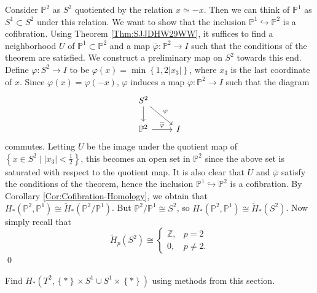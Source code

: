 \begin{solution}
    Consider $\mathbb{P}^2$ as 
    $S^2$ quotiented by the relation
    $x \simeq -x$. Then
    we can think of  $\mathbb{P}^{1}$ as
    $S^{1} \subset S^{2}$ under this relation.
    We want to show that the inclusion
    $\mathbb{P}^{1} \hookrightarrow \mathbb{P}^2$ is a
    cofibration. 
    Using Theorem \ref{Thm:SJJDHW29WW}, it suffices to
    find a neighborhood $U$ of $\mathbb{P}^{1} \subset 
    \mathbb{P}^2$ and a map $\overline{\varphi } \colon
    \mathbb{P}^2 \to I$ such that
    the conditions of the theorem are satisfied.
    We construct a preliminary map on
    $S^2$ towards this end. 
    Define $\varphi \colon S^2 \to I$ to be
    $\varphi (x) = 
    \min \left\{ 1, 2 \left| x_3 \right|  \right\} $, where
    $x_3$ is the last coordinate of $x$. Since
    $\varphi (x) = \varphi (-x)$, $\varphi $ induces
    a map $\overline{\varphi }\colon
    \mathbb{P}^2 \to I$ such that the diagram
    \begin{equation*}
    \begin{tikzcd}
        S^2 \ar[d] \ar[dr, "\varphi "] & \\
        \mathbb{P}^2 \ar[r, "\overline{\varphi }"] & I
    \end{tikzcd}
    \end{equation*}
    commutes.
    Letting $U$ be the image under the quotient
    map of 
    $\left\{ x \in S^2  \mid 
    \left| x_3 \right| < \frac{1}{2} \right\} $, this
    becomes an open set in $\mathbb{P}^2$ since 
    the above set is saturated with respect to the quotient
    map. It is also clear that
    $U$ and $\overline{\varphi }$ satisfy the conditions of
    the theorem, hence the inclusion
    $\mathbb{P}^{1} \hookrightarrow \mathbb{P}^2$ is a cofibration.
    By Corollary \ref{Cor:Cofibration-Homology}, we
    obtain that
    $H_* \left( \mathbb{P}^2, \mathbb{P}^{1} \right) 
    \cong \tilde{H}_* \left( \mathbb{P}^2 / \mathbb{P}^{1} \right) $.
    But $\mathbb{P}^2 / \mathbb{P}^{1} \cong
    S^{2}$, so
    $H_* \left( \mathbb{P}^2, \mathbb{P}^{1} \right) 
    \cong \tilde{H}_* \left( S^2 \right)$.
    Now simply recall that
    \[
    \tilde{H}_p \left( S^2 \right) 
    \cong
    \begin{cases}
        \mathbb{Z},& p = 2\\
        0,& p \neq 2.
    \end{cases}
    \] 
    \qed
\end{solution}

\begin{problem}[]
    Find $H_*\left( T^2,
    \left\{ * \right\} \times S^{1} \cup 
S^{1} \times \left\{ * \right\} \right) $ using
methods from this section.
\end{problem}

